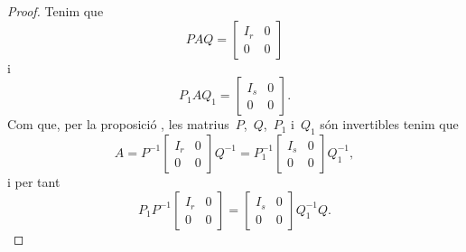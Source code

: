 \documentclass[../../Main.tex]{subfiles}
\begin{document}
\begin{theorem}
\begin{proof}
			Tenim que
			\[PAQ=\left[\begin{array}{c|c}
			I_{r} & 0\\\hline
			0 & 0
			\end{array}\right]\]
			i
			\[P_{1}AQ_{1}=\left[\begin{array}{c|c}
			I_{s} & 0\\\hline
			0 & 0
			\end{array}\right].\]
			Com que, per la proposició , les matrius~\(P\),~\(Q\),~\(P_{1}\) i~\(Q_{1}\) són invertibles tenim que
			\[A=P^{-1}\left[\begin{array}{c|c}
			I_{r} & 0\\\hline
			0 & 0
			\end{array}\right]Q^{-1}=P_{1}^{-1}\left[\begin{array}{c|c}
			I_{s} & 0\\\hline
			0 & 0
			\end{array}\right]Q_{1}^{-1},\]
			i per tant
			\[P_{1}P^{-1}\left[\begin{array}{c|c}
			I_{r} & 0\\\hline
			0 & 0
			\end{array}\right]=
			\left[\begin{array}{c|c}
			I_{s} & 0\\\hline
			0 & 0
			\end{array}\right]Q_{1}^{-1}Q.\]


\end{proof}
\end{theorem}
\end{document}
